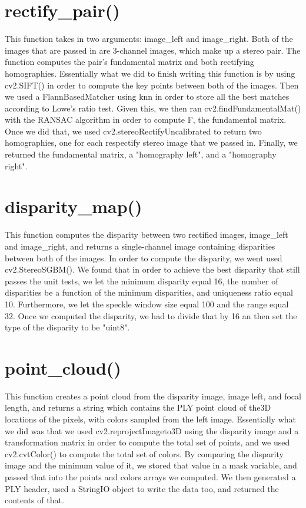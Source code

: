 \documentclass[10pt]{article}
\begin{document}
\section{rectify\_pair()}
\label{rectifyPair}
\sf This function takes in two arguments: image\_left and image\_right. Both of the images that are passed in are 3-channel images, which make up a stereo pair.
The function computes the pair's fundamental matrix and both rectifying homographies. Essentially what we did to finish writing this function is by using cv2.SIFT() in order to compute the key points between both of the images. Then we used a FlannBasedMatcher using knn in order to store all the best matches according to Lowe's ratio test. Given this, we then ran cv2.findFundamentalMat() with the RANSAC algorithm in order to compute F, the fundamental matrix. Once we did that, we used cv2.stereoRectifyUncalibrated to return two homographies, one for each respectify stereo image that we passed in. Finally, we returned the fundamental matrix, a "homography left", and a "homography right".

\section{disparity\_map()}
\label{disparityMap}
\sf This function computes the disparity between two rectified images, image\_left and image\_right, and returns a single-channel image containing disparities between both of the images. In order to compute the disparity, we went used cv2.StereoSGBM(). We found that in order to achieve the best disparity that still passes the unit tests, we let the minimum disparity equal 16, the number of disparities be a function of the minimum disparities, and uniqueness ratio equal 10. Furthermore, we let the speckle window size equal 100 and the range equal 32. Once we computed the disparity, we had to divide that by 16 an then set the type of the disparity to be "uint8". 

\section{point\_cloud()}
\label{pointCloud}
\sf This function creates a point cloud from the disparity image, image left, and focal length, and returns a string which contains the PLY point cloud of the3D locations of the pixels, with colors sampled from the left image. Essentially what we did was that we used cv2.reprojectImageto3D using the disparity image and a transformation matrix in order to compute the total set of points, and we used cv2.cvtColor() to compute the total set of colors. By comparing the disparity image and the minimum value of it, we stored that value in a mask variable, and passed that into the points and colors arrays we computed. We then generated a PLY header, used a StringIO object to write the data too, and returned the contents of that.
\end{document}
